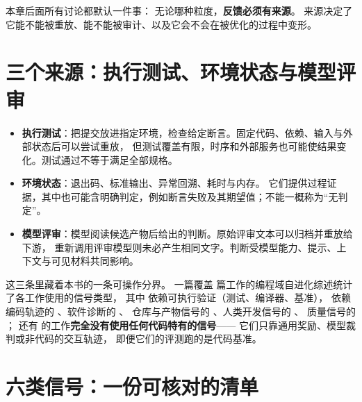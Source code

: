本章后面所有讨论都默认一件事：
无论哪种粒度，\textbf{反馈必须有来源}。
来源决定了它能不能被重放、能不能被审计、以及它会不会在被优化的过程中变形。

\section{三个来源：执行测试、环境状态与模型评审}
\label{sec:ch04-source}

\begin{itemize}
  \item \textbf{执行测试}：把提交放进指定环境，检查给定断言。固定代码、依赖、输入与外部状态后可以尝试重放，
        但测试覆盖有限，时序和外部服务也可能使结果变化。测试通过不等于满足全部规格。
  \item \textbf{环境状态}：退出码、标准输出、异常回溯、耗时与内存。
        它们提供过程证据，其中也可能含明确判定，例如断言失败及其期望值；不能一概称为“无判定”。
  \item \textbf{模型评审}：模型阅读候选产物后给出的判断。原始评审文本可以归档并重放给下游，
        重新调用评审模型则未必产生相同文字。判断受模型能力、提示、上下文与可见材料共同影响。
\end{itemize}

这三条里藏着本书的一条可操作分界。
一篇覆盖  篇工作的编程域自进化综述统计了各工作使用的信号类型，
其中  依赖可执行验证（测试、编译器、基准），
依赖编码轨迹的 、软件诊断的 、
仓库与产物信号的 、人类开发信号的 、
质量信号的 ；
还有  的工作\textbf{完全没有使用任何代码特有的信号}——
它们只靠通用奖励、模型裁判或非代码的交互轨迹，
即便它们的评测跑的是代码基准\cite{coding-survey-2608}。

\section{六类信号：一份可核对的清单}
\label{sec:ch04-six}

